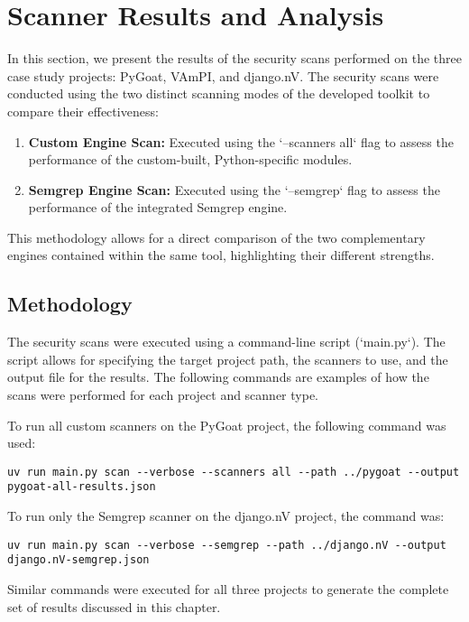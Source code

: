 
\section{Scanner Results and Analysis}
In this section, we present the results of the security scans performed on the three case study projects: PyGoat, VAmPI, and django.nV. The security scans were conducted using the two distinct scanning modes of the developed toolkit to compare their effectiveness:
\begin{enumerate}
    \item \textbf{Custom Engine Scan:} Executed using the `--scanners all` flag to assess the performance of the custom-built, Python-specific modules.
    \item \textbf{Semgrep Engine Scan:} Executed using the `--semgrep` flag to assess the performance of the integrated Semgrep engine.
\end{enumerate}

This methodology allows for a direct comparison of the two complementary engines contained within the same tool, highlighting their different strengths.

\subsection{Methodology}

The security scans were executed using a command-line script (`main.py`). The script allows for specifying the target project path, the scanners to use, and the output file for the results. The following commands are examples of how the scans were performed for each project and scanner type.

To run all custom scanners on the PyGoat project, the following command was used:
\begin{verbatim}
uv run main.py scan --verbose --scanners all --path ../pygoat --output pygoat-all-results.json
\end{verbatim}

To run only the Semgrep scanner on the django.nV project, the command was:
\begin{verbatim}
uv run main.py scan --verbose --semgrep --path ../django.nV --output django.nV-semgrep.json
\end{verbatim}

Similar commands were executed for all three projects to generate the complete set of results discussed in this chapter.

